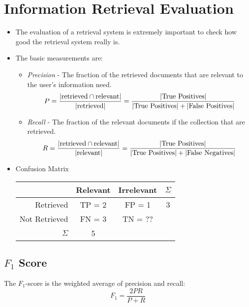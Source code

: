     \section{Information Retrieval Evaluation} %
        \begin{itemize}
        	\item The evaluation of a retrieval system is extremely important to check how good the retrieval system really is.
        	\item The basic measurements are:
        		\begin{itemize}
        			\item \textit{Precision} - The fraction of the retrieved documents that are relevant to the user's information need.
        				\begin{equation*}
            				P = \frac{\abs{\text{retrieved} \cap \text{relevant}}}{\abs{\text{retrieved}}} = \frac{\abs{\text{True Positives}}}{\abs{\text{True Positives}} + \abs{\text{False Positives}}}
        				\end{equation*}
        			\item \textit{Recall} - The fraction of the relevant documents if the collection that are retrieved.
        				\begin{equation*}
            				R = \frac{\abs{\text{retrieved} \cap \text{relevant}}}{\abs{\text{relevant}}} = \frac{\abs{\text{True Positives}}}{\abs{\text{True Positives}} + \abs{\text{False Negatives}}}
        				\end{equation*}
        		\end{itemize}
        	\item Confusion Matrix
        		\begin{table}[H]
        			\centering
        			\begin{tabular}{r | c | c | c}
        				& Relevant & Irrelevant & \( \Sigma \) \\ \hline
        				Retrieved & TP = 2 & FP = 1 & 3 \\ \hline
        				Not Retrieved & FN = 3 & TN = ?? & \\ \hline
        				\(\Sigma\) & 5 & &
        			\end{tabular}
        		\end{table}
        \end{itemize}

        \subsection{\( F _ 1 \) Score} %
            The \(F_1\)-score is the weighted average of precision and recall:
            \begin{equation*}
                F_1 = \frac{2PR}{P + R} \tag{Harmonic Mean of \(P\) and \(R\)}
            \end{equation*}
            
